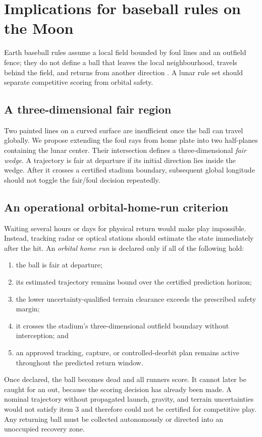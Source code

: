\section{Implications for baseball rules on the Moon}

Earth baseball rules assume a local field bounded by foul lines and an outfield fence; they do not define a ball that leaves the local neighbourhood, travels behind the field, and returns from another direction \cite{MLBRules2026}. A lunar rule set should separate competitive scoring from orbital safety.

\subsection{A three-dimensional fair region}

Two painted lines on a curved surface are insufficient once the ball can travel globally. We propose extending the foul rays from home plate into two half-planes containing the lunar center. Their intersection defines a three-dimensional \emph{fair wedge}. A trajectory is fair at departure if its initial direction lies inside the wedge. After it crosses a certified stadium boundary, subsequent global longitude should not toggle the fair/foul decision repeatedly.

\subsection{An operational orbital-home-run criterion}

Waiting several hours or days for physical return would make play
impossible. Instead, tracking radar or optical stations should estimate the
state immediately after the hit. An \emph{orbital home run} is declared only
if all of the following hold:
\begin{enumerate}
    \item the ball is fair at departure;
    \item its estimated trajectory remains bound over the certified
          prediction horizon;
    \item the lower uncertainty-qualified terrain clearance exceeds the
          prescribed safety margin;
    \item it crosses the stadium's three-dimensional outfield boundary
          without interception; and
    \item an approved tracking, capture, or controlled-deorbit plan remains
          active throughout the predicted return window.
\end{enumerate}
Once declared, the ball becomes dead and all runners score. It cannot later
be caught for an out, because the scoring decision has already been made.
A nominal trajectory without propagated launch, gravity, and terrain
uncertainties would not satisfy item 3 and therefore could not be certified
for competitive play. Any returning ball must be collected autonomously or
directed into an unoccupied recovery zone.

